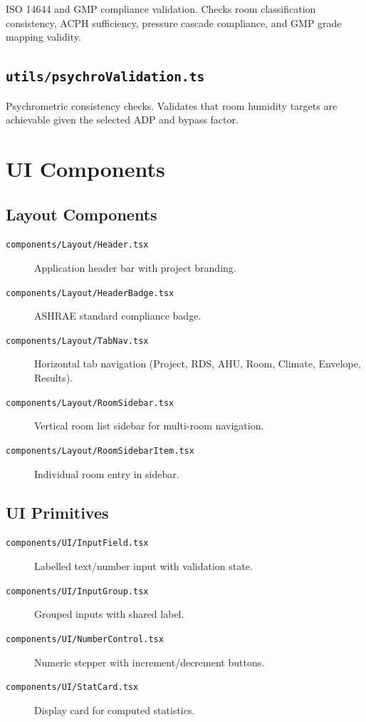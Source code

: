 \documentclass[12pt, a4paper, oneside]{report}
\newcommand{\file}[1]{\texttt{\textcolor{codeblue}{#1}}}
\begin{document}
ISO 14644 and GMP compliance validation. Checks room classification consistency, ACPH sufficiency, pressure cascade compliance, and GMP grade mapping validity.

\section{\file{utils/psychroValidation.ts}}

Psychrometric consistency checks. Validates that room humidity targets are achievable given the selected ADP and bypass factor.


\chapter{UI Components}

\section{Layout Components}

\begin{description}
  \item[\file{components/Layout/Header.tsx}] Application header bar with project branding.
  \item[\file{components/Layout/HeaderBadge.tsx}] ASHRAE standard compliance badge.
  \item[\file{components/Layout/TabNav.tsx}] Horizontal tab navigation (Project, RDS, AHU, Room, Climate, Envelope, Results).
  \item[\file{components/Layout/RoomSidebar.tsx}] Vertical room list sidebar for multi-room navigation.
  \item[\file{components/Layout/RoomSidebarItem.tsx}] Individual room entry in sidebar.
\end{description}

\section{UI Primitives}

\begin{description}
  \item[\file{components/UI/InputField.tsx}] Labelled text/number input with validation state.
  \item[\file{components/UI/InputGroup.tsx}] Grouped inputs with shared label.
  \item[\file{components/UI/NumberControl.tsx}] Numeric stepper with increment/decrement buttons.
  \item[\file{components/UI/StatCard.tsx}] Display card for computed statistics.
\end{description}
\end{document}
